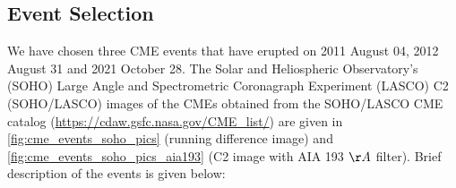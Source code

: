 \subsection{Event Selection}
\label{sec:selection_of_events}

We have chosen three CME events that have erupted on 2011 August 04, 2012 August 31 and 2021 October 28. The Solar and Heliospheric Observatory's  (SOHO) Large Angle and Spectrometric Coronagraph Experiment (LASCO) C2 (SOHO/LASCO) images of the CMEs obtained from the SOHO/LASCO CME catalog (\url{https://cdaw.gsfc.nasa.gov/CME_list/}) are given in \cref{fig:cme_events_soho_pics} (running difference image) and \cref{fig:cme_events_soho_pics_aia193} (C2 image with AIA 193 $\AA$ filter). Brief description of the events is given below:\\

